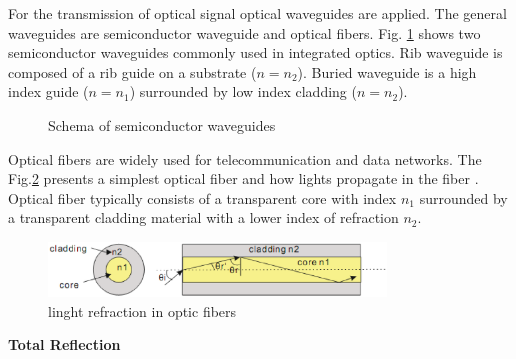 For the transmission of optical signal optical waveguides are applied. The general waveguides are semiconductor waveguide and optical fibers. 
Fig. \ref{fig:semi_waveguides} shows two semiconductor waveguides commonly used in integrated optics. Rib waveguide is composed of a rib guide on a substrate ($n=n_{2}$). Buried waveguide is a high index guide ($n=n_{1}$) surrounded by low index cladding ($n=n_{2}$).\\
\begin{figure}
\centering
{}
\hfill
{}
\caption{Schema of semiconductor waveguides}
\label{fig:semi_waveguides}
\end{figure}
Optical fibers are widely used for telecommunication and data networks. The Fig.\ref{fig:opticfiber} presents a simplest optical fiber and how lights propagate in the fiber . Optical fiber typically consists of a transparent core with index $n_{1}$ surrounded by a transparent cladding material with a lower index of refraction $n_{2}$. 
\begin{figure}[httbp]
\centering
\includegraphics[width=0.8\textwidth]{bilder/opticfiber}
\caption{linght refraction in optic fibers}
\label{fig:opticfiber}
\end{figure}
\textbf{ Total Reflection}\\
